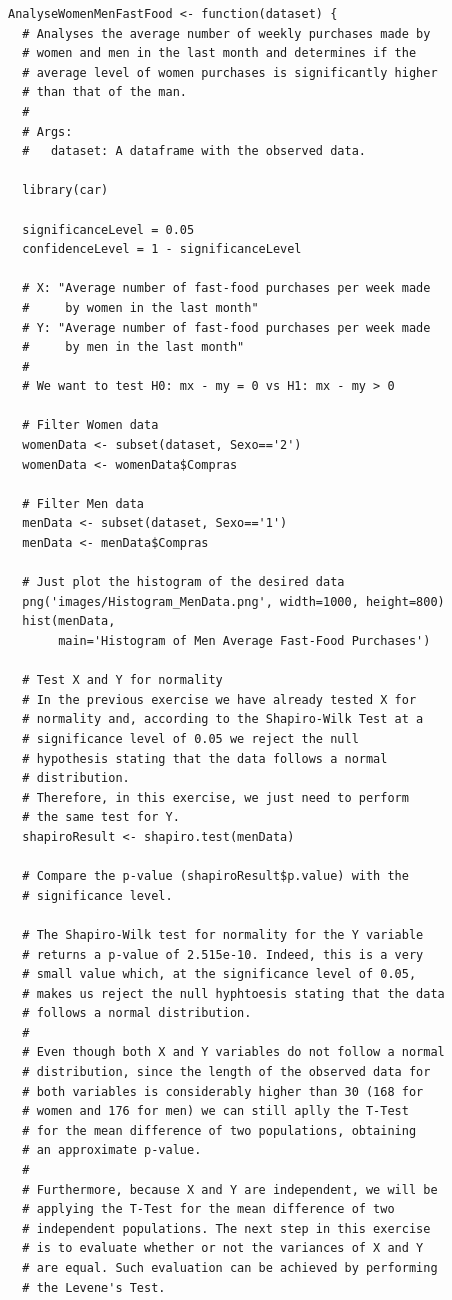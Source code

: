 \documentclass[12pt]{article}
\begin{document}
\begin{lstlisting}
AnalyseWomenMenFastFood <- function(dataset) {
  # Analyses the average number of weekly purchases made by
  # women and men in the last month and determines if the
  # average level of women purchases is significantly higher
  # than that of the man.
  #
  # Args:
  #   dataset: A dataframe with the observed data.

  library(car)

  significanceLevel = 0.05
  confidenceLevel = 1 - significanceLevel

  # X: "Average number of fast-food purchases per week made
  #     by women in the last month"
  # Y: "Average number of fast-food purchases per week made
  #     by men in the last month"
  #
  # We want to test H0: mx - my = 0 vs H1: mx - my > 0

  # Filter Women data
  womenData <- subset(dataset, Sexo=='2')
  womenData <- womenData$Compras

  # Filter Men data
  menData <- subset(dataset, Sexo=='1')
  menData <- menData$Compras

  # Just plot the histogram of the desired data
  png('images/Histogram_MenData.png', width=1000, height=800)
  hist(menData,
       main='Histogram of Men Average Fast-Food Purchases')

  # Test X and Y for normality
  # In the previous exercise we have already tested X for
  # normality and, according to the Shapiro-Wilk Test at a
  # significance level of 0.05 we reject the null
  # hypothesis stating that the data follows a normal
  # distribution.
  # Therefore, in this exercise, we just need to perform
  # the same test for Y.
  shapiroResult <- shapiro.test(menData)

  # Compare the p-value (shapiroResult$p.value) with the
  # significance level.

  # The Shapiro-Wilk test for normality for the Y variable
  # returns a p-value of 2.515e-10. Indeed, this is a very
  # small value which, at the significance level of 0.05,
  # makes us reject the null hyphtoesis stating that the data
  # follows a normal distribution.
  #
  # Even though both X and Y variables do not follow a normal
  # distribution, since the length of the observed data for
  # both variables is considerably higher than 30 (168 for
  # women and 176 for men) we can still aplly the T-Test
  # for the mean difference of two populations, obtaining
  # an approximate p-value.
  #
  # Furthermore, because X and Y are independent, we will be
  # applying the T-Test for the mean difference of two
  # independent populations. The next step in this exercise
  # is to evaluate whether or not the variances of X and Y
  # are equal. Such evaluation can be achieved by performing
  # the Levene's Test.


\end{lstlisting}
\end{document}
